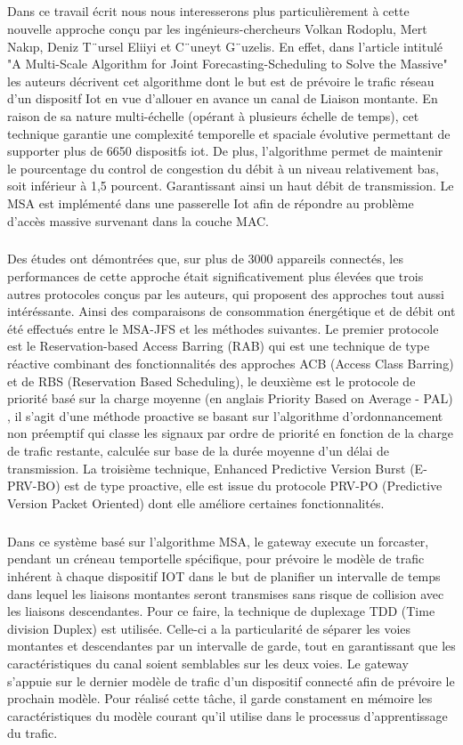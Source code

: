 \documentclass[12pt]{article}
\begin{document}
\subparagraph{}Dans ce travail écrit nous nous interesserons plus particulièrement à cette nouvelle approche conçu par les ingénieurs-chercheurs Volkan Rodoplu, Mert Nakıp,  Deniz T¨ursel Eliiyi et C¨uneyt G¨uzelis. 
En effet, dans l'article intitulé "A Multi-Scale Algorithm for Joint Forecasting-Scheduling to Solve the Massive" les auteurs décrivent cet algorithme dont le but est de prévoire le trafic réseau d'un dispositf Iot en vue d'allouer en avance un canal de Liaison montante. 
En raison de sa nature multi-échelle (opérant à plusieurs échelle de temps), cet technique garantie une complexité temporelle et spaciale évolutive permettant de supporter plus de 6650 dispositfs iot.
De plus, l'algorithme permet de maintenir le pourcentage du control de congestion du débit à un niveau relativement bas, soit inférieur à 1,5 pourcent. Garantissant ainsi un haut débit de transmission.
Le MSA est implémenté dans une passerelle Iot afin de répondre au problème d'accès massive survenant dans la couche MAC.

\subparagraph{} Des études ont démontrées que, sur plus de 3000 appareils connectés, les performances de cette approche était significativement plus élevées que trois autres protocoles conçus par les auteurs, qui proposent des approches tout aussi intéréssante.
Ainsi des comparaisons de consommation énergétique et de débit ont été effectués entre le MSA-JFS et les méthodes suivantes.
Le premier protocole est le Reservation-based Access Barring (RAB) qui est une technique de type réactive combinant des fonctionnalités des approches ACB (Access Class Barring) et de RBS (Reservation Based Scheduling), le deuxième est le protocole de priorité basé sur la charge moyenne (en anglais Priority Based on Average - PAL)
, il s'agit d'une méthode proactive se basant sur l'algorithme d'ordonnancement non préemptif qui classe les signaux par ordre de priorité en fonction de la charge de trafic restante, calculée sur base de la durée moyenne d'un délai de transmission.
La troisième technique, Enhanced Predictive Version Burst (E-PRV-BO) est de type proactive, elle est issue du protocole PRV-PO (Predictive Version Packet Oriented) dont elle améliore certaines fonctionnalités.

\subparagraph{} Dans ce système basé sur l'algorithme MSA, le gateway execute un forcaster, pendant un créneau temportelle spécifique, pour prévoire le modèle de trafic inhérent à chaque dispositif IOT dans le but de planifier un intervalle de temps dans lequel les liaisons montantes seront transmises sans risque de collision avec les liaisons descendantes. 
Pour ce faire, la technique de duplexage TDD (Time division Duplex) est utilisée. Celle-ci a la particularité de séparer les voies montantes et descendantes par un intervalle de garde, tout en garantissant que les caractéristiques du canal soient semblables sur les deux voies.
Le gateway s'appuie sur le dernier modèle de trafic d'un dispositif connecté afin de prévoire le prochain modèle. Pour réalisé cette tâche, il garde constament en mémoire les caractéristiques du modèle courant qu'il utilise dans le processus d'apprentissage du trafic.
\end{document}
